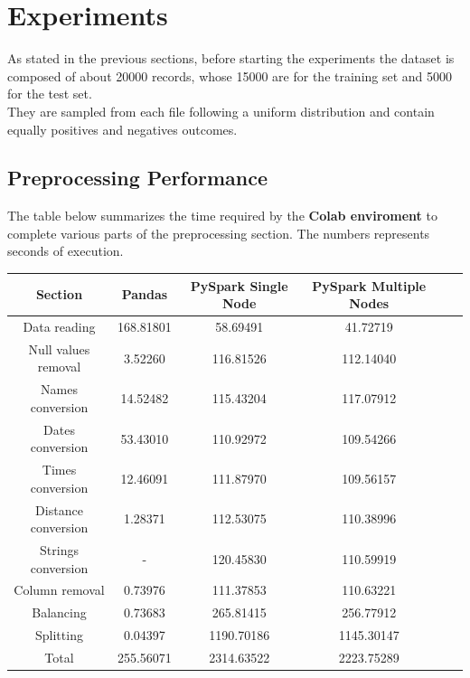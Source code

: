 \documentclass[
	letterpaper, %
	10pt, %
]{class}
\begin{document}
\section{Experiments}

As stated in the previous sections, before starting the experiments the dataset is composed of about 20000 records, whose 15000 are for the training set and 5000 for the test set.\\
They are sampled from each file following a uniform distribution and contain equally positives and negatives outcomes.

\subsection{Preprocessing Performance}

The table below summarizes the time required by the \textbf{Colab enviroment} to complete various parts of the preprocessing section.
The numbers represents seconds of execution.

\begin{center}
    \begin{tabular}{ |c|c|c|c|c|c| }
        \hline
        Section             & Pandas    & PySpark Single Node & PySpark Multiple Nodes \\
        \hline
        Data reading        & 168.81801 & 58.69491            & 41.72719               \\
        Null values removal & 3.52260   & 116.81526           & 112.14040              \\
        Names conversion    & 14.52482  & 115.43204           & 117.07912              \\
        Dates conversion    & 53.43010  & 110.92972           & 109.54266              \\
        Times conversion    & 12.46091  & 111.87970           & 109.56157              \\
        Distance conversion & 1.28371   & 112.53075           & 110.38996              \\
        Strings conversion  & -         & 120.45830           & 110.59919              \\
        Column removal      & 0.73976   & 111.37853           & 110.63221              \\
        Balancing           & 0.73683   & 265.81415           & 256.77912              \\
        Splitting           & 0.04397   & 1190.70186          & 1145.30147             \\
        Total               & 255.56071 & 2314.63522          & 2223.75289             \\
        \hline
    \end{tabular}
\end{center}
\end{document}
